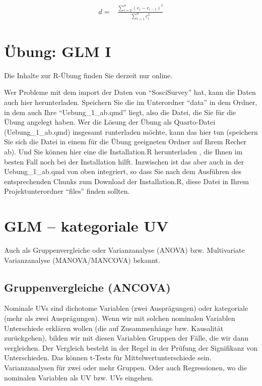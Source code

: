 \documentclass[
  10pt,
  letterpaper,
  a4paper, twoside]{scrreprt}
\begin{document}
\begin{align}
  d =& \frac{\sum_{i=2}^n(e_i-e_{i-1})^2}{\sum_{i=1}^n e^2_i} \label{eq-DWT}
\end{align}


\chapter{Übung: GLM I}\label{uxfcbung-glm-i}

Die Inhalte zur R-Übung finden Sie derzeit nur online.

Wer Probleme mit dem import der Daten von \enquote{SosciSurvey} hat,
kann die Daten auch hier herunterladen. Speichern Sie die im Unterordner
\enquote{data} in dem Ordner, in dem auch Ihre
\enquote{Uebung\_1\_ab.qmd} liegt, also die Datei, die Sie für die Übung
angelegt haben. Wer die Lösung der Übung als Quarto-Datei
(Uebung\_1\_ab.qmd) insgesamt runterladen möchte, kann das hier tun
(speichern Sie sich die Datei in einem für die Übung geeigneten Ordner
auf Ihrem Recher ab). Und Sie können hier eine die Installation.R
herunterladen , die Ihnen im besten Fall noch bei der Installation
hilft. Inzwischen ist das aber auch in der Uebung\_1\_ab.qmd von oben
integriert, so dass Sie nach dem Ausführen des entsprechenden Chunks zum
Download der Installation.R, diese Datei in Ihrem Projektunterordner
\enquote{files} finden sollten.


\chapter{GLM -- kategoriale UV}\label{glm-kategoriale-uv}

Auch als Gruppenvergleiche oder Varianzanalyse (ANOVA) bzw. Multivariate
Varianzanalyse (MANOVA/MANCOVA) bekannt.

\section{Gruppenvergleiche (ANCOVA)}\label{gruppenvergleiche-ancova}

Nominale UVs sind dichotome Variablen (zwei Ausprägungen) oder
kategoriale (mehr als zwei Ausprägungen). Wenn wir mit solchen nominalen
Variablen Unterschiede erklären wollen (die auf Zusammenhänge bzw.
Kausalität zurückgehen), bilden wir mit diesen Variablen Gruppen der
Fälle, die wir dann vergleichen. Der Vergleich besteht in der Regel in
der Prüfung der Signifikanz von Unterschieden. Das können t-Tests für
Mittelwertunterschiede sein. Varianzanalysen für zwei oder mehr Gruppen.
Oder auch Regressionen, wo die nominalen Variablen als UV bzw. UVs
eingehen.
\end{document}
